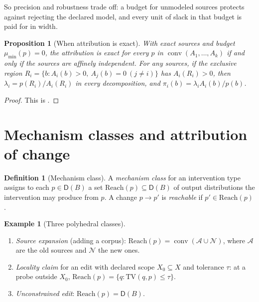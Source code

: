 \documentclass[11pt]{article}
\newtheorem{proposition}[theorem]{Proposition}
\theoremstyle{definition}
\newtheorem{definition}[theorem]{Definition}
\newtheorem{example}[theorem]{Example}
\theoremstyle{remark}
\newcommand{\D}{\mathsf{D}}
\newcommand{\TV}{\mathrm{TV}}
\newcommand{\Reach}{\mathrm{Reach}}
\newcommand{\cA}{\mathcal{A}}
\newcommand{\conv}{\operatorname{conv}}
\begin{document}
So precision and robustness trade off: a budget for unmodeled sources protects against rejecting the
declared model, and every unit of slack in that budget is paid for in width.

\begin{proposition}[When attribution is exact]\label{prop:exact}
With exact sources and budget $\mu_{\min}(p)=0$, the attribution is exact for every $p$ in
$\conv(A_1,\dots,A_k)$ if and only if the sources are affinely independent. For any sources, if the
exclusive region $R_i=\{b:A_i(b)>0,\ A_j(b)=0\ (j\ne i)\}$ has $A_i(R_i)>0$, then
$\lambda_i=p(R_i)/A_i(R_i)$ in every decomposition, and $\pi_i(b)=\lambda_iA_i(b)/p(b)$.
\end{proposition}
\begin{proof}
This is \cite[Prop.~5.7]{Awasthi-Tower}.
\end{proof}

\section{Mechanism classes and attribution of change}\label{sec:mechanisms}

\begin{definition}[Mechanism class]
A \emph{mechanism class} for an intervention type assigns to each $p\in\D(B)$ a set
$\Reach(p)\subseteq\D(B)$ of output distributions the intervention may produce from $p$. A change
$p\to p'$ is \emph{reachable} if $p'\in\Reach(p)$.
\end{definition}

\begin{example}[Three polyhedral classes]\label{ex:classes}
\leavevmode
\begin{enumerate}[label=(\alph*)]
\item \emph{Source expansion} (adding a corpus): $\Reach(p)=\conv(\cA\cup\mathcal{N})$, where $\cA$
  are the old sources and $\mathcal{N}$ the new ones.
\item \emph{Locality claim} for an edit with declared scope $X_0\subseteq X$ and tolerance $\tau$: at
  a probe outside $X_0$, $\Reach(p)=\{q:\TV(q,p)\le\tau\}$.
\item \emph{Unconstrained edit}: $\Reach(p)=\D(B)$.
\end{enumerate}
\end{example}
\end{document}

